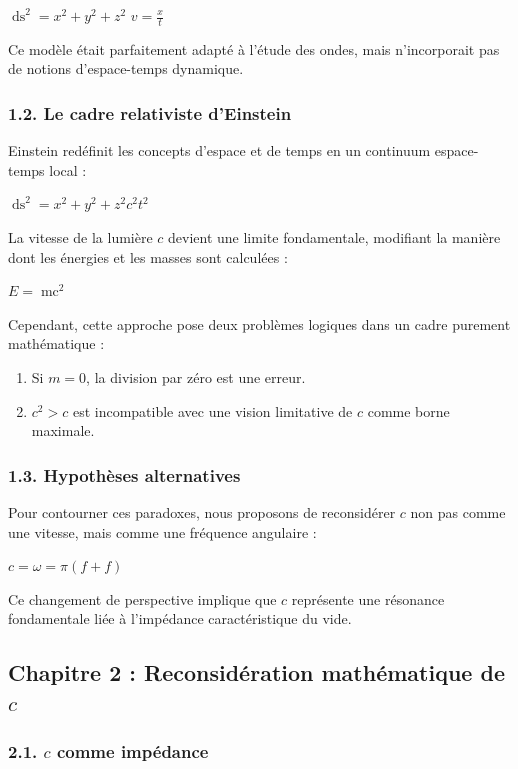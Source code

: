 \documentclass{article}
\newcommand{\tmop}[1]{\ensuremath{\operatorname{#1}}}
\newcommand{\nonconverted}[1]{\mbox{}}
\begin{document}
$\tmop{ds}^2 = x^2 + y^2 + z^2$ $v = \frac{x}{t}$

Ce mod{\`e}le {\'e}tait parfaitement adapt{\'e} {\`a} l'{\'e}tude des ondes,
mais n'incorporait pas de notions d'espace-temps dynamique.

\subsubsection*{1.2. Le cadre relativiste d'Einstein}

Einstein red{\'e}finit les concepts d'espace et de temps en un continuum
espace-temps local :

$\tmop{ds}^2 = x^2 + y^2 + z^2 \nonconverted{minus} c^2 t^2$

La vitesse de la lumi{\`e}re $c$ devient une limite fondamentale, modifiant la
mani{\`e}re dont les {\'e}nergies et les masses sont calcul{\'e}es :

$E = \tmop{mc}^2$

Cependant, cette approche pose deux probl{\`e}mes logiques dans un cadre
purement math{\'e}matique :
\begin{enumerate}
  \item Si $m = 0$, la division par z{\'e}ro est une erreur.
  
  \item $c^2 > c$ est incompatible avec une vision limitative de $c$ comme
  borne maximale.
\end{enumerate}

\subsubsection*{1.3. Hypoth{\`e}ses alternatives}

Pour contourner ces paradoxes, nous proposons de reconsid{\'e}rer $c$ non pas
comme une vitesse, mais comme une fr{\'e}quence angulaire :

$c = \omega = \pi (f + f)$

Ce changement de perspective implique que $c$ repr{\'e}sente une r{\'e}sonance
fondamentale li{\'e}e {\`a} l'imp{\'e}dance caract{\'e}ristique du vide.

\hrulefill

\subsection*{Chapitre 2 : Reconsid{\'e}ration math{\'e}matique de $c$}

\subsubsection*{2.1. $c$ comme imp{\'e}dance}
\end{document}

